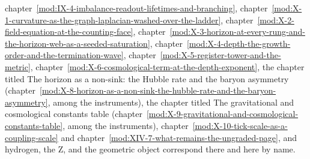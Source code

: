 \begin{chbridge}
chapter~\ref{mod:IX-4-imbalance-readout-lifetimes-and-branching}, chapter~\ref{mod:X-1-curvature-as-the-graph-laplacian-washed-over-the-ladder}, chapter~\ref{mod:X-2-field-equation-at-the-counting-face}, chapter~\ref{mod:X-3-horizon-at-every-rung-and-the-horizon-web-as-a-seeded-saturation}, chapter~\ref{mod:X-4-depth-the-growth-order-and-the-termination-wave}, chapter~\ref{mod:X-5-register-tower-and-the-metric}, chapter~\ref{mod:X-6-cosmological-term-at-the-depth-exponent}, the chapter titled The horizon as a non-sink: the Hubble rate and the baryon asymmetry (chapter~\ref{mod:X-8-horizon-as-a-non-sink-the-hubble-rate-and-the-baryon-asymmetry}, among the instruments), the chapter titled The gravitational and cosmological constants table (chapter~\ref{mod:X-9-gravitational-and-cosmological-constants-table}, among the instruments), chapter~\ref{mod:X-10-tick-scale-as-a-coupling-scale} and chapter~\ref{mod:XIV-7-what-remains-the-ungraded-page}, and hydrogen, the Z, and the geometric object correspond there and here by name.
\end{chbridge}
